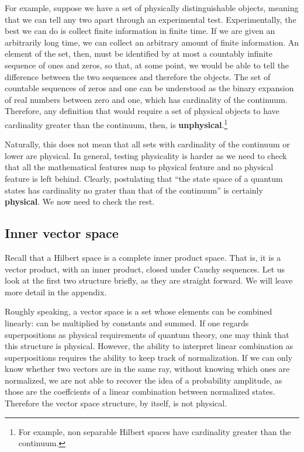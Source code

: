 \documentclass[10pt,twocolumn, nofootinbib]{revtex4-2}
\begin{document}
For example, suppose we have a set of physically distinguishable objects, meaning that we can tell any two apart through an experimental test. Experimentally, the best we can do is collect finite information in finite time. If we are given an arbitrarily long time, we can collect an arbitrary amount of finite information. An element of the set, then, must be identified by at most a countably infinite sequence of ones and zeros, so that, at some point, we would be able to tell the difference between the two sequences and therefore the objects. The set of countable sequences of zeros and one can be understood as the binary expansion of real numbers between zero and one, which has cardinality of the continuum. Therefore, any definition that would require a set of physical objects to have cardinality greater than the continuum, then, is \textbf{unphysical}.\footnote{For example, non separable Hilbert spaces have cardinality greater than the continuum.}

Naturally, this does not mean that all sets with cardinality of the continuum or lower are physical. In general, testing physicality is harder as we need to check that all the mathematical features map to physical feature and no physical feature is left behind. Clearly, postulating that ``the state space of a quantum states has cardinality no grater than that of the continuum'' is certainly \textbf{physical}. We now need to check the rest.

\subsection{Inner vector space}

Recall that a Hilbert space is a complete inner product space. That is, it is a vector product, with an inner product, closed under Cauchy sequences. Let us look at the first two structure briefly, as they are straight forward. We will leave more detail in the appendix.

Roughly speaking, a vector space is a set whose elements can be combined linearly: can be multiplied by constants and summed. If one regards superpositions as physical requirements of quantum theory, one may think that this structure is physical. However, the ability to interpret linear combination as superpositions requires the ability to keep track of normalization. If we can only know whether two vectors are in the same ray, without knowing which ones are normalized, we are not able to recover the idea of a probability amplitude, as those are the coeffcients of a linear combination between normalized states. Therefore the vector space structure, by itself, is not physical.
\end{document}
